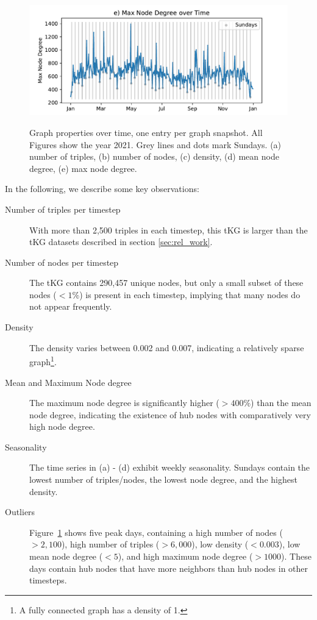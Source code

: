 \begin{figure}[!t]
\begin{minipage}{0.43\textwidth}
\end{minipage}
\hfill
\begin{minipage}{0.43\textwidth}
	\centering
	\includegraphics[width=\textwidth]{figs/acled_subset_gta_aggregatedMax Node Degree.pdf}\\
\end{minipage}
\caption{Graph properties over time, one entry per graph snapshot. All Figures show the year 2021. 
Grey lines and dots mark Sundays. (a) number of triples, (b) number of nodes, (c) density, (d) mean node degree, (e) max node degree.}  
\label{fig:graph_params_timeseries}
\end{figure}

In the following, we describe some key observations: 
\begin{description}
    \item[Number of triples per timestep] With more than 2,500 triples in each timestep, this tKG is larger than the tKG datasets described in section \ref{sec:rel_work}.
    \item[Number of nodes per timestep] The tKG contains 290,457 unique nodes, but only a small subset of these nodes ($<1\%$) is present in each timestep, implying that many nodes do not appear frequently.
    \item[Density] The density varies between 0.002 and 0.007, indicating a relatively sparse graph\footnote{A fully connected graph has a density of 1.}.
    \item[Mean and Maximum Node degree] The maximum node degree is significantly higher ($>400\%$) than the mean node degree, indicating the existence of hub nodes with comparatively very high node degree.
    \item[Seasonality] The time series in (a) - (d) exhibit weekly seasonality. Sundays contain the lowest number of triples/nodes, the lowest node degree, and the highest density.
    \item[Outliers] Figure~\ref{fig:graph_params_timeseries} shows five peak days, containing a high number of nodes ($>2,100$), high number of triples ($>6,000$), low density ($<0.003$), low mean node degree ($<5$), and high maximum node degree ($>1000$). These days contain hub nodes that have more neighbors than hub nodes in other timesteps.
\end{description}


